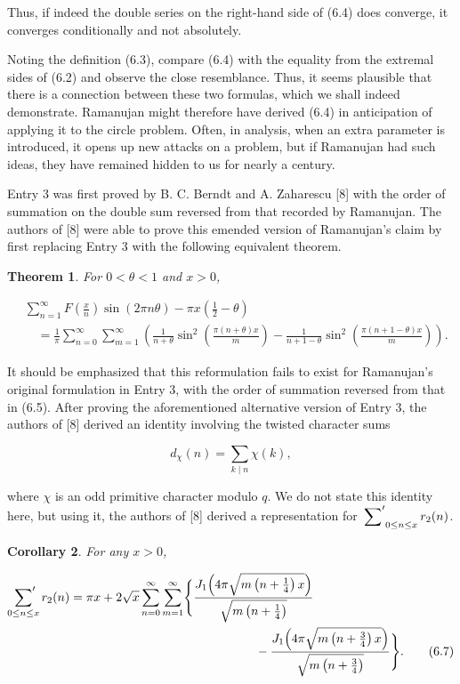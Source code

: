 \documentclass[10pt]{article}
\newcommand{\sump}{\sideset{}{'}\sum}
\theoremstyle{plain}
\newtheorem{theorem}{Theorem}
\newtheorem{corollary}[theorem]{Corollary}
\begin{document}
Thus, if indeed the double series on the right-hand side of (6.4) does converge, it converges conditionally and not absolutely.

Noting the definition (6.3), compare (6.4) with the equality from the extremal sides of (6.2) and observe the close resemblance. Thus, it seems plausible that there is a connection between these two formulas, which we shall indeed demonstrate. Ramanujan might therefore have derived (6.4) in anticipation of applying it to the circle problem. Often, in analysis, when an extra parameter is introduced, it opens up new attacks on a problem, but if Ramanujan had such ideas, they have remained hidden to us for nearly a century.

Entry 3 was first proved by B. C. Berndt and A. Zaharescu [8] with the order of summation on the double sum reversed from that recorded by Ramanujan. The authors of [8] were able to prove this emended version of Ramanujan's claim by first replacing Entry 3 with the following equivalent theorem.

\begin{theorem}
For $0<\theta<1$ and $x>0$,


\begin{align*}
& \sum_{n=1}^{\infty} F\left(\frac{x}{n}\right) \sin (2 \pi n \theta)-\pi x\left(\frac{1}{2}-\theta\right) \\
& \quad=\frac{1}{\pi} \sum_{n=0}^{\infty} \sum_{m=1}^{\infty}\left(\frac{1}{n+\theta} \sin ^{2}\left(\frac{\pi(n+\theta) x}{m}\right)-\frac{1}{n+1-\theta} \sin ^{2}\left(\frac{\pi(n+1-\theta) x}{m}\right)\right) . \tag{6.5}
\end{align*}
\end{theorem}

It should be emphasized that this reformulation fails to exist for Ramanujan's original formulation in Entry 3, with the order of summation reversed from that in (6.5). After proving the aforementioned alternative version of Entry 3, the authors of [8] derived an identity involving the twisted character sums


\begin{equation*}
d_{\chi}(n)=\sum_{k \mid n} \chi(k), \tag{6.6}
\end{equation*}


where $\chi$ is an odd primitive character modulo $q$. We do not state this identity here, but using it, the authors of [8] derived a representation for $\sump_{0 \leq n \leq x} r_{2}(n)$.

\begin{corollary}
For any $x>0$,


\begin{align*}
\sump_{0\leq n\leq x} r_{2}(n)
={}&\pi x+2\sqrt{x}\sum_{n=0}^{\infty}\sum_{m=1}^{\infty}
\Biggl\{
\frac{J_{1}\!\left(4\pi\sqrt{m\left(n+\frac14\right)x}\right)}
     {\sqrt{m\left(n+\frac14\right)}} \\
&\hspace{4.8cm}{}-
\frac{J_{1}\!\left(4\pi\sqrt{m\left(n+\frac34\right)x}\right)}
     {\sqrt{m\left(n+\frac34\right)}}
\Biggr\}.
\tag{6.7}
\end{align*}
\end{corollary}
\end{document}
